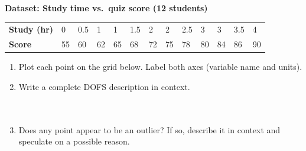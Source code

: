 \documentclass[10pt]{article}
\begin{document}
\begin{tcolorbox}[colback=white, colframe=black!40, boxrule=0.8pt, arc=2mm,
    left=4mm, right=4mm, top=3mm, bottom=3mm,
    title={\textbf{Tier R --- Remediate}}, fonttitle=\bfseries, halign title=center]
\small

\textbf{Dataset: Study time vs.\ quiz score (12 students)}

\vspace{6pt}
\renewcommand{\arraystretch}{1.4}
\begin{tabularx}{\linewidth}{@{} l *{12}{C{0.72cm}} @{}}
\textbf{Study (hr)} & 0 & 0.5 & 1 & 1 & 1.5 & 2 & 2 & 2.5 & 3 & 3 & 3.5 & 4 \\
\textbf{Score}      & 55 & 60 & 62 & 65 & 68 & 72 & 75 & 78 & 80 & 84 & 86 & 90 \\
\end{tabularx}

\vspace{10pt}

\begin{enumerate}[leftmargin=1.6em, itemsep=0.18in]

  \item Plot each point on the grid below. Label both axes (variable name and units).

        \vspace{6pt}
        \begin{center}
        \end{center}

  \item Write a complete DOFS description in context.\\[8pt]
        \writeline\\[2pt]\writeline\\[2pt]\writeline

  \item Does any point appear to be an outlier? If so, describe it in context and speculate
        on a possible reason.\\[8pt]
        \writeline\\[2pt]\writeline

\end{enumerate}
\end{tcolorbox}
\end{document}
